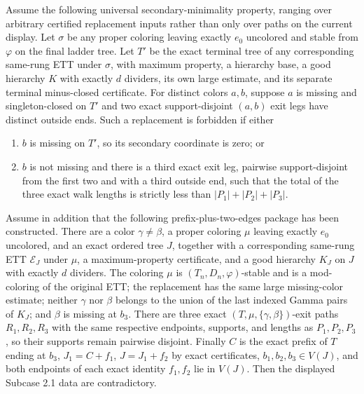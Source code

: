 \begin{lemma}
Assume the following universal secondary-minimality property, ranging
over arbitrary certified replacement inputs rather than only over paths
on the current display.  Let $\sigma$ be any proper coloring leaving
exactly $e_0$ uncolored and stable from $\varphi$ on the final ladder
tree.  Let $T'$ be the exact terminal tree of any corresponding
same-rung ETT under $\sigma$, with maximum property, a hierarchy base,
a good hierarchy $K$ with exactly $d$ dividers, its own large estimate,
and its separate terminal minus-closed certificate.  For distinct colors
$a,b$, suppose $a$ is missing and singleton-closed on $T'$ and two exact
support-disjoint $(a,b)$ exit legs have distinct outside ends.  Such a
replacement is forbidden if either
\begin{enumerate}
\item $b$ is missing on $T'$, so its secondary coordinate is zero; or
\item $b$ is not missing and there is a third exact exit leg, pairwise
support-disjoint from the first two and with a third outside end, such
that the total of the three exact walk lengths is strictly less than
$|P_1|+|P_2|+|P_3|$.
\end{enumerate}
Assume in addition that the following prefix-plus-two-edges package has
been constructed.  There are a color $\gamma\ne\beta$, a proper coloring
$\mu$ leaving exactly $e_0$ uncolored, and an exact ordered tree $J$,
together with a corresponding same-rung ETT $\mathcal E_J$ under $\mu$,
a maximum-property certificate, and a good hierarchy $K_J$ on $J$ with
exactly $d$ dividers.  The coloring $\mu$ is
$(T_n,D_n,\varphi)$-stable and is a mod-coloring of the original ETT; the
replacement has the same large missing-color estimate; neither $\gamma$
nor $\beta$ belongs to the union of the last indexed Gamma pairs of
$K_J$; and $\beta$ is missing at $b_3$.  There are three exact
$(T,\mu,\{\gamma,\beta\})$-exit paths $R_1,R_2,R_3$ with the same
respective endpoints, supports, and lengths as $P_1,P_2,P_3$, so their
supports remain pairwise disjoint.  Finally $C$ is the exact prefix of
$T$ ending at $b_3$, $J_1=C+f_1$, $J=J_1+f_2$ by exact
 certificates, $b_1,b_2,b_3\in V(J)$,
and both endpoints of each exact identity $f_1,f_2$ lie in $V(J)$.
Then the displayed Subcase 2.1 data are contradictory.
\end{lemma}
